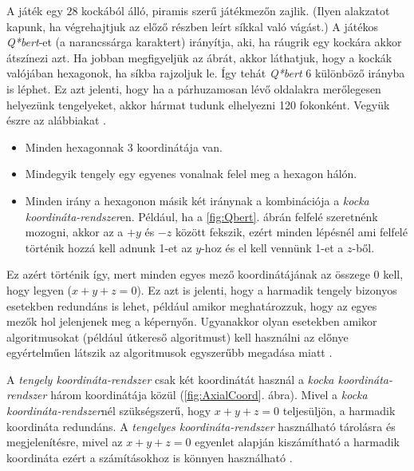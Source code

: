 A játék egy $28$ kockából álló, piramis szerű játékmezőn zajlik. (Ilyen alakzatot kapunk, ha végrehajtjuk az előző részben leírt síkkal való vágást.) \newpage \noindent A játékos \textit{Q*bert}-et (a narancssárga karaktert) irányítja, aki, ha ráugrik egy kockára akkor átszínezi azt. Ha jobban megfigyeljük az ábrát, akkor láthatjuk, hogy a kockák valójában hexagonok, ha síkba rajzoljuk le. Így tehát \textit{Q*bert} 6 különböző irányba is léphet. Ez azt jelenti, hogy ha a párhuzamosan lévő oldalakra merőlegesen helyezünk tengelyeket, akkor hármat tudunk elhelyezni 120 fokonként. Vegyük észre az alábbiakat \cite{HexagonalGrids}.
\begin{itemize}
\item Minden hexagonnak 3 koordinátája van. 
\item Mindegyik tengely egy egyenes vonalnak felel meg a hexagon hálón.
\item Minden irány a hexagonon másik két iránynak a kombinációja a \textit{kocka koordináta-rendszer}en. Például, ha a \ref{fig:Qbert}. ábrán felfelé szeretnénk mozogni, akkor az a $+y$ és $-z$ között fekszik, ezért minden lépésnél ami felfelé történik hozzá kell adnunk 1-et az $y$-hoz és el kell vennünk 1-et a $z$-ből. 
\end{itemize}
Ez azért történik így, mert minden egyes mező koordinátájának az összege $0$ kell, hogy legyen ($x + y + z = 0$). Ez azt is jelenti, hogy a harmadik tengely bizonyos esetekben redundáns is lehet, például amikor meghatározzuk, hogy az egyes mezők hol jelenjenek meg a képernyőn. Ugyanakkor olyan esetekben amikor algoritmusokat (például útkereső algoritmust) kell használni az előnye egyértelműen látszik az algoritmusok egyszerűbb megadása miatt \cite{Cube}. 


A \textit{tengely koordináta-rendszer} csak két koordinátát használ a \textit{kocka koordináta-rendszer} három koordinátája közül (\ref{fig:AxialCoord}. ábra). Mivel a \textit{kocka koordináta-rendszer}nél szükségszerű, hogy  $x + y + z = 0$ teljesüljön, a harmadik koordináta redundáns.  A \textit{tengelyes koordináta-rendszer} használható tárolásra és megjelenítésre, mivel az $x + y + z = 0$ egyenlet alapján kiszámítható a harmadik koordináta ezért a számításokhoz is könnyen használható \cite{Axial}.

